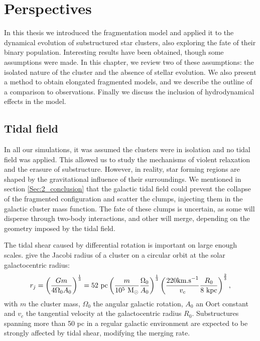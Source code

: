 \chapter{Perspectives}

In this thesis we introduced the \HubLem fragmentation model and applied it to the dynamical evolution of substructured star clusters, also exploring the fate of their binary population. Interesting results have been obtained, though some assumptions were made. In this chapter, we review two of these assumptions:  the isolated nature of the cluster and the absence of stellar evolution.  We also present a method to obtain elongated fragmented models, and we describe the outline of a comparison to observations. Finally we discuss the inclusion of hydrodynamical effects in the model.


\minitoc



\section{Tidal field}

In all our simulations, it was assumed the clusters were in isolation and no tidal field was applied. This allowed us to study the mechanisms of violent relaxation and the erasure of substructure. However, in reality, star forming regions are shaped by the gravitational influence of their surroundings. We mentioned in section \ref{Sec:2_conclusion} that the galactic tidal field could prevent the collapse of the \HubLem fragmented configuration and scatter the clumps, injecting them in the galactic cluster mass function. The fate of these clumps is uncertain, as some will disperse through two-body interactions, and other will merge, depending on the geometry imposed by the tidal field. 


The tidal shear caused by differential rotation is important on large enough scales. \cite{BT} give the Jacobi radius of a cluster on a circular orbit at the solar galactocentric radius:
\begin{equation}
r_j = \left( \frac{G m}{4 \Omega_0 A_0} \right)^\frac{1}{3} = 52~{\textrm{pc}} \left( \frac{m}{10^5~{\textrm{M}_\odot}} \frac{\Omega_0}{A_0} \right)^\frac{1}{3} \left( \frac{220 \textrm{km.s}^{-1}}{v_c} \frac{R_0}{8~\textrm{kpc}} \right)^\frac{2}{3},
\end{equation}
with $m$ the cluster mass, $\Omega_0$ the angular galactic rotation, $A_0$ an Oort constant and $v_c$ the tangential velocity at the galactocentric radius $R_0$. Substructures spanning more than 50 pc in a regular galactic environment are expected to be strongly affected by tidal shear, modifying the merging rate.

